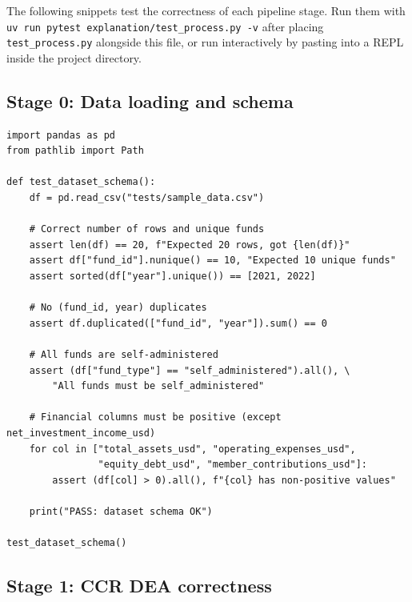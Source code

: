 \documentclass[12pt,a4paper]{article}
\begin{document}
The following snippets test the correctness of each pipeline stage.
Run them with \texttt{uv run pytest explanation/test\_process.py -v}
after placing \texttt{test\_process.py} alongside this file,
or run interactively by pasting into a REPL inside the project directory.

\bigskip

\subsection{Stage 0: Data loading and schema}

\begin{lstlisting}[style=python, caption={Test: CSV loads with correct schema and types}]
import pandas as pd
from pathlib import Path

def test_dataset_schema():
    df = pd.read_csv("tests/sample_data.csv")

    # Correct number of rows and unique funds
    assert len(df) == 20, f"Expected 20 rows, got {len(df)}"
    assert df["fund_id"].nunique() == 10, "Expected 10 unique funds"
    assert sorted(df["year"].unique()) == [2021, 2022]

    # No (fund_id, year) duplicates
    assert df.duplicated(["fund_id", "year"]).sum() == 0

    # All funds are self-administered
    assert (df["fund_type"] == "self_administered").all(), \
        "All funds must be self_administered"

    # Financial columns must be positive (except net_investment_income_usd)
    for col in ["total_assets_usd", "operating_expenses_usd",
                "equity_debt_usd", "member_contributions_usd"]:
        assert (df[col] > 0).all(), f"{col} has non-positive values"

    print("PASS: dataset schema OK")

test_dataset_schema()
\end{lstlisting}

\subsection{Stage 1: CCR DEA correctness}
\end{document}
